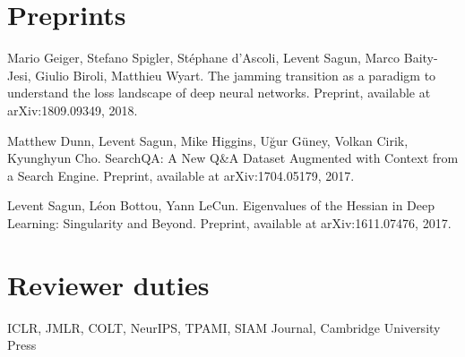 \documentclass[10pt,letterpaper]{article}
\renewenvironment{itemize}
{
\begin{list}{}{\setlength{\leftmargin}{1.5em}}
}
{
  \end{list}
}
\begin{document}
\section*{Preprints}
\begin{itemize}

\item Mario Geiger, Stefano Spigler, St\'ephane d'Ascoli, Levent Sagun, Marco Baity-Jesi, Giulio Biroli, Matthieu Wyart. The jamming transition as a paradigm to understand the loss landscape of deep neural networks. Preprint, available at arXiv:1809.09349, 2018.

\item Matthew Dunn, Levent Sagun, Mike Higgins, U\u{g}ur G\"uney, Volkan Cirik, Kyunghyun Cho. SearchQA: A New Q\&A Dataset Augmented with Context from a Search Engine. Preprint, available at arXiv:1704.05179, 2017.

\item Levent Sagun, L\'eon Bottou, Yann LeCun. Eigenvalues of the Hessian in Deep Learning: Singularity and Beyond. Preprint, available at arXiv:1611.07476, 2017.
\end{itemize}


\section*{Reviewer duties}
\begin{itemize}
    \item ICLR, JMLR, COLT, NeurIPS, TPAMI, SIAM Journal, Cambridge University Press
\end{itemize}

\end{document}
